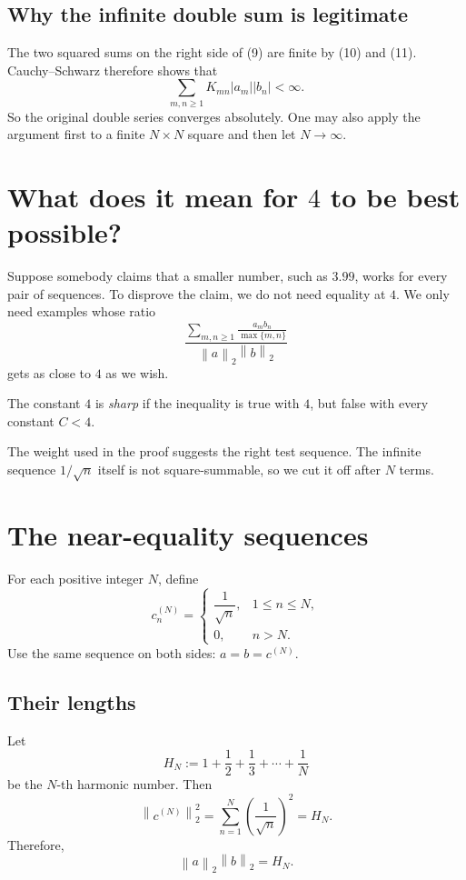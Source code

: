 \documentclass[11pt]{article}
\newcommand{\norm}[1]{\left\lVert #1\right\rVert}
\begin{document}
\subsection{Why the infinite double sum is legitimate}

The two squared sums on the right side of (9) are finite by (10) and (11). Cauchy--Schwarz therefore shows that
\[
  \sum_{m,n\geq1}K_{mn}|a_m||b_n|<\infty.
\]
So the original double series converges absolutely. One may also apply the argument first to a finite \(N\times N\) square and then let \(N\to\infty\).

\section{What does it mean for \(4\) to be best possible?}

Suppose somebody claims that a smaller number, such as \(3.99\), works for every pair of sequences. To disprove the claim, we do not need equality at \(4\). We only need examples whose ratio
\[
  \frac{\displaystyle
  \sum_{m,n\geq1}\frac{a_mb_n}{\max\{m,n\}}}
  {\norm a_2\norm b_2}
\]
gets as close to \(4\) as we wish.

\begin{definitionBox}
The constant \(4\) is \emph{sharp} if the inequality is true with \(4\), but false with every constant \(C<4\).
\end{definitionBox}

The weight used in the proof suggests the right test sequence. The infinite sequence \(1/\sqrt n\) itself is not square-summable, so we cut it off after \(N\) terms.

\section{The near-equality sequences}

For each positive integer \(N\), define
\[
  c_n^{(N)}=
  \begin{cases}
    \dfrac1{\sqrt n},&1\leq n\leq N,\\[5pt]
    0,&n>N.
  \end{cases}
  \tag{12}
\]
Use the same sequence on both sides: \(a=b=c^{(N)}\).

\subsection{Their lengths}

Let
\[
  H_N:=1+\frac12+\frac13+\cdots+\frac1N
\]
be the \(N\)-th harmonic number. Then
\[
  \norm{c^{(N)}}_2^2
  =\sum_{n=1}^{N}\left(\frac1{\sqrt n}\right)^2
  =H_N.
\]
Therefore,
\[
  \norm{a}_2\norm{b}_2=H_N.
  \tag{13}
\]
\end{document}
